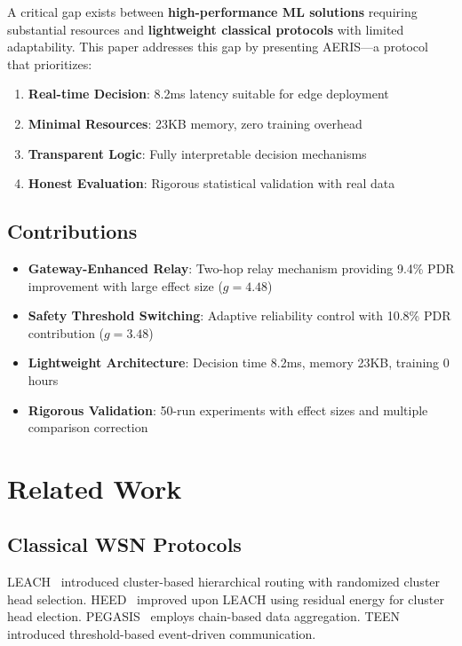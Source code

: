 \documentclass[11pt,a4paper]{article}
\begin{document}
A critical gap exists between \textbf{high-performance ML solutions} requiring substantial resources and \textbf{lightweight classical protocols} with limited adaptability. This paper addresses this gap by presenting AERIS---a protocol that prioritizes:

\begin{enumerate}
    \item \textbf{Real-time Decision}: 8.2ms latency suitable for edge deployment
    \item \textbf{Minimal Resources}: 23KB memory, zero training overhead
    \item \textbf{Transparent Logic}: Fully interpretable decision mechanisms
    \item \textbf{Honest Evaluation}: Rigorous statistical validation with real data
\end{enumerate}

\subsection{Contributions}

\begin{itemize}
    \item \textbf{Gateway-Enhanced Relay}: Two-hop relay mechanism providing 9.4\% PDR improvement with large effect size ($g=4.48$)
    \item \textbf{Safety Threshold Switching}: Adaptive reliability control with 10.8\% PDR contribution ($g=3.48$)
    \item \textbf{Lightweight Architecture}: Decision time 8.2ms, memory 23KB, training 0 hours
    \item \textbf{Rigorous Validation}: 50-run experiments with effect sizes and multiple comparison correction
\end{itemize}

\section{Related Work}

\subsection{Classical WSN Protocols}

LEACH~\cite{Heinzelman2000LEACH} introduced cluster-based hierarchical routing with randomized cluster head selection. HEED~\cite{Younis2004HEED} improved upon LEACH using residual energy for cluster head election. PEGASIS~\cite{Lindsey2002PEGASIS} employs chain-based data aggregation. TEEN~\cite{Manjeshwar2001TEEN} introduced threshold-based event-driven communication.
\end{document}
